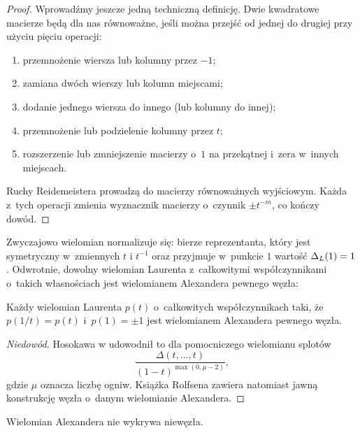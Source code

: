\begin{proof}
    Wprowadźmy jeszcze jedną techniczną definicję.
    Dwie kwadratowe macierze będą dla nas równoważne, jeśli można przejść od jednej do drugiej przy użyciu pięciu operacji:
    \begin{enumerate}
        \item przemnożenie wiersza lub kolumny przez $-1$;
        \item zamiana dwóch wierszy lub kolumn miejscami;
        \item dodanie jednego wiersza do innego (lub kolumny do innej);
        \item przemnożenie lub podzielenie kolumny przez $t$;
        \item rozszerzenie lub zmniejszenie macierzy o~$1$ na przekątnej i~zera w~innych miejscach.
    \end{enumerate}

    Ruchy Reidemeistera prowadzą do macierzy równoważnych wyjściowym.
    Każda z~tych operacji zmienia wyznacznik macierzy o~czynnik $\pm t^{-m}$, co kończy dowód.
\end{proof}

Zwyczajowo wielomian normalizuje się: bierze reprezentanta, który jest symetryczny w~zmiennych $t$ i $t^{-1}$ oraz przyjmuje w~punkcie $1$ wartość $\Delta_L(1) = 1$.
Odwrotnie, dowolny wielomian Laurenta z~całkowitymi współczynnikami o~takich własnościach jest wielomianem Alexandera pewnego węzła:

\begin{proposition}
\label{prp:alexander_hosokawa}%
    Każdy wielomian Laurenta $p(t)$ o~całkowitych współczynnikach taki, że $p(1/t) = p(t)$ i~$p(1) = \pm 1$ jest wielomianem Alexandera pewnego węzła.
\end{proposition}

\begin{proof}[Niedowód]
%
    Hosokawa w \cite{hosokawa58} udowodnił to dla pomocniczego wielomianu splotów
    \begin{equation}
        \frac{\Delta(t, \ldots, t)}{(1-t)^{\max(0, \mu - 2)}},
    \end{equation}
    gdzie $\mu$ oznacza liczbę ogniw.
    Książka Rolfsena \cite[s. 171-172]{rolfsen76} zawiera natomiast jawną konstrukcję węzła o~danym wielomianie Alexandera.
\end{proof}

\begin{proposition}
\label{alexander_no_detects_unknot}%
    Wielomian Alexandera nie wykrywa niewęzła.
\end{proposition}

